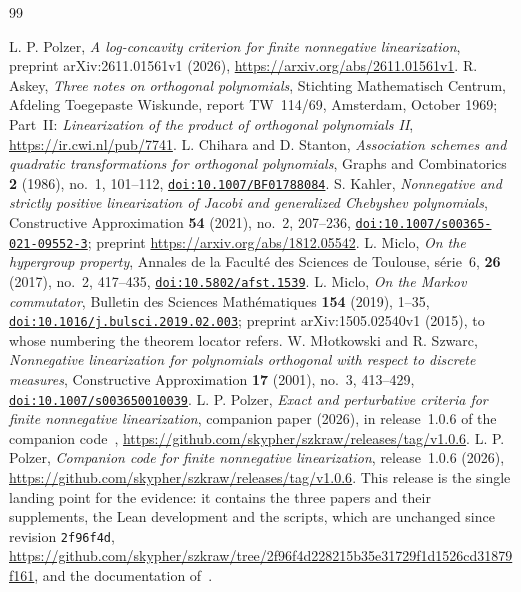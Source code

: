 \begin{thebibliography}{99}

 L. P. Polzer, \emph{A log-concavity criterion for finite nonnegative linearization}, preprint arXiv:2611.01561v1 (2026), \url{https://arxiv.org/abs/2611.01561v1}.
 R. Askey, \emph{Three notes on orthogonal polynomials}, Stichting Mathematisch Centrum, Afdeling Toegepaste Wiskunde, report TW~114/69, Amsterdam, October 1969; Part~II: \emph{Linearization of the product of orthogonal polynomials II}, \url{https://ir.cwi.nl/pub/7741}.
 L. Chihara and D. Stanton, \emph{Association schemes and quadratic transformations for orthogonal polynomials}, Graphs and Combinatorics \textbf{2} (1986), no.~1, 101--112, \href{https://doi.org/10.1007/BF01788084}{\nolinkurl{doi:10.1007/BF01788084}}.
 S. Kahler, \emph{Nonnegative and strictly positive linearization of Jacobi and generalized Chebyshev polynomials}, Constructive Approximation \textbf{54} (2021), no.~2, 207--236, \href{https://doi.org/10.1007/s00365-021-09552-3}{\nolinkurl{doi:10.1007/s00365-021-09552-3}}; preprint \url{https://arxiv.org/abs/1812.05542}.
 L. Miclo, \emph{On the hypergroup property}, Annales de la Facult\'e des Sciences de Toulouse, s\'erie~6, \textbf{26} (2017), no.~2, 417--435, \href{https://doi.org/10.5802/afst.1539}{\nolinkurl{doi:10.5802/afst.1539}}.
 L. Miclo, \emph{On the Markov commutator}, Bulletin des Sciences Math\'ematiques \textbf{154} (2019), 1--35, \href{https://doi.org/10.1016/j.bulsci.2019.02.003}{\nolinkurl{doi:10.1016/j.bulsci.2019.02.003}}; preprint arXiv:1505.02540v1 (2015), to whose numbering the theorem locator refers.
 W. M{\l}otkowski and R. Szwarc, \emph{Nonnegative linearization for polynomials orthogonal with respect to discrete measures}, Constructive Approximation \textbf{17} (2001), no.~3, 413--429, \href{https://doi.org/10.1007/s003650010039}{\nolinkurl{doi:10.1007/s003650010039}}.
 L. P. Polzer, \emph{Exact and perturbative criteria for finite nonnegative linearization}, companion paper (2026), in release~1.0.6 of the companion code~\cite{code}, \url{https://github.com/skypher/szkraw/releases/tag/v1.0.6}.
 L. P. Polzer, \emph{Companion code for finite nonnegative linearization}, release~1.0.6 (2026), \url{https://github.com/skypher/szkraw/releases/tag/v1.0.6}. This release is the single landing point for the evidence: it contains the three papers and their supplements, the Lean development and the scripts, which are unchanged since revision \texttt{2f96f4d}, \url{https://github.com/skypher/szkraw/tree/2f96f4d228215b35e31729f1d1526cd31879f161}, and the documentation of~\cite{docs}.

\end{thebibliography}
